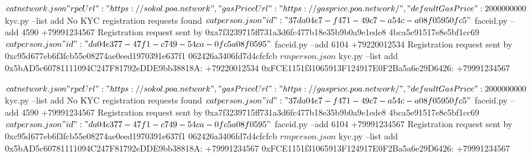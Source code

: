 \begin{myverbbox}[\small]{\output}
$ cat network.json
{"rpcUrl": "https://sokol.poa.network", "gasPriceUrl": "https://gasprice.
poa.network/", "defaultGasPrice": 2000000000}
$ kyc.py --list add
No KYC registration requests found
$ cat person.json
{"id": "37da04e7-f471-49c7-a54c-a08f05950fc5"}
$ faceid.py --add 4590 +79991234567
Registration request sent by 0xa7f3239715ff731a3d6fc477b18e35b9b0a9e1ede8
4bca5e91517e8e5bf1cc69
$ cat person.json
{"id": "da04e377-47f1-c749-54ca-0fc5a08f0595"}
$ faceid.py --add 6104 +79220012534
Registration request sent by 0xc95d677eb6f3fcb55e08274ae0eed1970391e637f1
062426a3406fd7d4cfcfcb
$ rm person.json
$ kyc.py --list add
0x5bAD5c60781111094C247F81792eDDE9bb38818A: +79220012534
0xFCE1151f31065913F124917E0F2Ba5a6e29D6426: +79991234567
\end{myverbbox}

\begin{myverbbox}[\small]{\output}
$ cat network.json
{"rpcUrl": "https://sokol.poa.network", "gasPriceUrl": "https://gasprice.
poa.network/", "defaultGasPrice": 2000000000}
$ kyc.py --list add
No KYC registration requests found
$ cat person.json
{"id": "37da04e7-f471-49c7-a54c-a08f05950fc5"}
$ faceid.py --add 4590 +79991234567
Registration request sent by 0xa7f3239715ff731a3d6fc477b18e35b9b0a9e1ede8
4bca5e91517e8e5bf1cc69
$ cat person.json
{"id": "da04e377-47f1-c749-54ca-0fc5a08f0595"}
$ faceid.py --add 6104 +79991234567
Registration request sent by 0xc95d677eb6f3fcb55e08274ae0eed1970391e637f1
062426a3406fd7d4cfcfcb
$ rm person.json
$ kyc.py --list add
0x5bAD5c60781111094C247F81792eDDE9bb38818A: +79991234567
0xFCE1151f31065913F124917E0F2Ba5a6e29D6426: +79991234567
\end{myverbbox}

